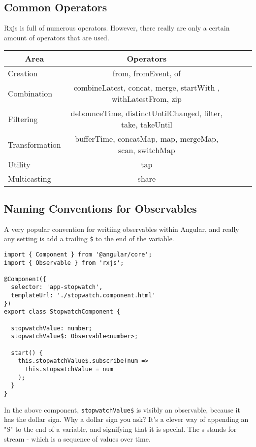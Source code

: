 \subsection{ Common Operators }
Rxjs is full of numerous operators. However, there really are only a certain
amount of operators that are used. 
\begin{center}
  \begin{tabular}{@{} l *4c @{}}
    \toprule
    \multicolumn{1}{c}{\color{red}Area} & Operators \\
    \midrule
    Creation       & from, fromEvent, of \\
    Combination    & combineLatest, concat, merge, startWith , withLatestFrom, zip \\
    Filtering      & debounceTime, distinctUntilChanged, filter, take, takeUntil \\
    Transformation & bufferTime, concatMap, map, mergeMap, scan, switchMap \\
    Utility        & tap \\
    Multicasting   & share \\
  \end{tabular}
\end{center}  

\subsection{ Naming Conventions for Observables }
A very popular convention for writiing observables within Angular, and really
any setting is add a trailing \lstinline{$} to the end of the variable. 
\begin{lstlisting}
import { Component } from '@angular/core';
import { Observable } from 'rxjs';

@Component({
  selector: 'app-stopwatch',
  templateUrl: './stopwatch.component.html'
})
export class StopwatchComponent {

  stopwatchValue: number;
  stopwatchValue$: Observable<number>;

  start() {
    this.stopwatchValue$.subscribe(num =>
      this.stopwatchValue = num
    );
  }
}  
\end{lstlisting}

In the above component, \lstinline{stopwatchValue$} is visibly an observable,
because it has the dollar sign. Why a dollar sign you ask? It's a clever way 
of appending an "S" to the end of a variable, and signifying that it is 
special. The s stands for stream - which is a sequence of values over time.



